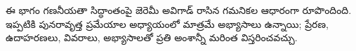 \documentclass[../../include/open-logic-part]{subfiles}
\begin{document}

\begin{editorial}
  ఈ భాగం గణనీయతా సిద్ధాంతంపై జెరెమీ అవిగాడ్ రాసిన గమనికల ఆధారంగా రూపొందింది.
  ఇప్పటికి పునరావృత్త ప్రమేయాల అధ్యాయంలో మాత్రమే అభ్యాసాలు ఉన్నాయి;
  ప్రేరణ, ఉదాహరణలు, వివరాలు, అభ్యాసాలతో ప్రతి అంశాన్నీ మరింత
  విస్తరించవచ్చు.
\end{editorial}



\OLEndPartHook
\end{document}

